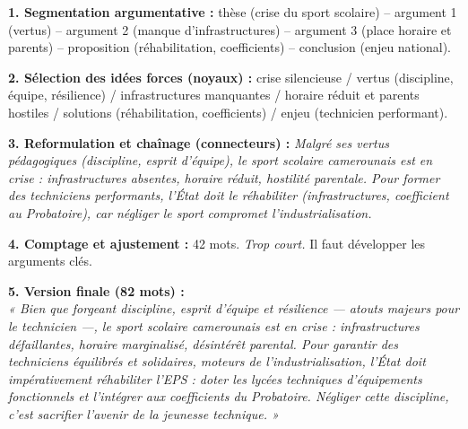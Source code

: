 \documentclass[11pt]{article}
\begin{document}
\begin{methode}
\textbf{1. Segmentation argumentative :} thèse (crise du sport scolaire) -- argument 1 (vertus) -- argument 2 (manque d'infrastructures) -- argument 3 (place horaire et parents) -- proposition (réhabilitation, coefficients) -- conclusion (enjeu national).

\textbf{2. Sélection des idées forces (noyaux) :} crise silencieuse / vertus (discipline, équipe, résilience) / infrastructures manquantes / horaire réduit et parents hostiles / solutions (réhabilitation, coefficients) / enjeu (technicien performant).

\textbf{3. Reformulation et chaînage (connecteurs) :} \emph{Malgré ses vertus pédagogiques (discipline, esprit d'équipe), le sport scolaire camerounais est en crise : infrastructures absentes, horaire réduit, hostilité parentale. Pour former des techniciens performants, l'État doit le réhabiliter (infrastructures, coefficient au Probatoire), car négliger le sport compromet l'industrialisation.}

\textbf{4. Comptage et ajustement :} 42 mots. \emph{Trop court.} Il faut développer les arguments clés.

\textbf{5. Version finale (82 mots) :} \\
\emph{« Bien que forgeant discipline, esprit d'équipe et résilience — atouts majeurs pour le technicien —, le sport scolaire camerounais est en crise : infrastructures défaillantes, horaire marginalisé, désintérêt parental. Pour garantir des techniciens équilibrés et solidaires, moteurs de l'industrialisation, l'État doit impérativement réhabiliter l'EPS : doter les lycées techniques d'équipements fonctionnels et l'intégrer aux coefficients du Probatoire. Négliger cette discipline, c'est sacrifier l'avenir de la jeunesse technique. »}
\end{methode}
\end{document}

